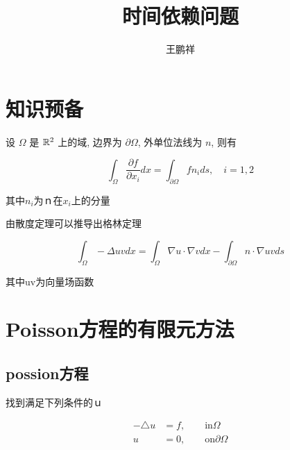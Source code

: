\documentclass{article}
\begin{document}
\title{时间依赖问题}
\author{王鹏祥}
\date{\chntoday}
\maketitle
\tableofcontents
\newpage

\section{知识预备}

\begin{theorem}
设 $\Omega$ 是 ${\mathbb R}^2$ 上的域, 边界为 $\partial\Omega$, 外单位法线为 $n$, 则有

\begin{equation}
\int_{\Omega} \frac{\partial f}{\partial x_{i}} d x=\int_{\partial \Omega} f n_{i} d s, \quad i=1,2
\end{equation}

其中$n_{i}$为ｎ在$x_i$上的分量
    
\end{theorem}

由散度定理可以推导出格林定理

\begin{theorem}

\begin{equation}
\int_{\Omega}-\Delta u v d x=\int_{\Omega} \nabla u \cdot \nabla v d x-\int_{\partial \Omega} n \cdot \nabla u v d s
\end{equation}
    
其中uv为向量场函数
\end{theorem}

\section{Poisson方程的有限元方法}

\subsection{possion方程}
找到满足下列条件的ｕ

\begin{equation}\label{1}
    \begin{alignat}{2}
        -\triangle u & =f,\qquad \text{in}\Omega \\
        u & =0, \qquad \text{on}\partial\Omega
    \end{alignat}
\end{equation}
\end{document}
